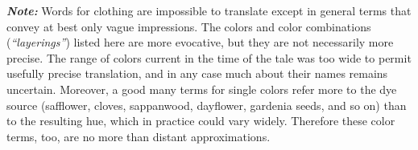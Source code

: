 \documentclass{article}
\begin{document}
\clearpage




\noindent \textbf{\textit{Note:}} Words for clothing are impossible to translate except in general terms that convey at best only vague impressions. The colors and color combinations (\textit{“layerings”}) listed here are more evocative, but they are not necessarily more precise. The range of colors current in the time of the tale was too wide to permit usefully precise translation, and in any case much about their names remains uncertain. Moreover, a good many terms for single colors refer more to the dye source (safflower, cloves, sappanwood, dayflower, gardenia seeds, and so on) than to the resulting hue, which in practice could vary widely. Therefore these color terms, too, are no more than distant approximations.


\end{document}
